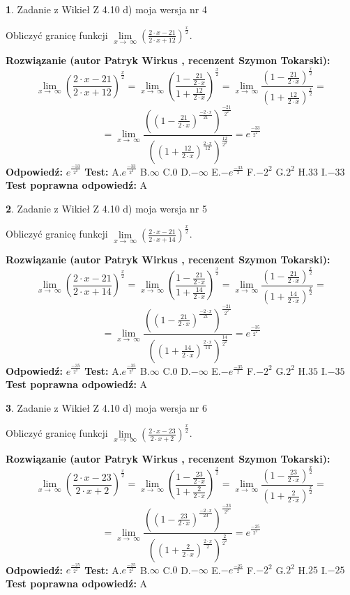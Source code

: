 \documentclass[12pt, a4paper]{article}
\theoremstyle{definition} %
\newtheorem{zad}{}
\newcommand{\zadStart}[1]{\begin{zad}#1\newline}
\newcommand{\zadStop}{\end{zad}}
\newcommand{\rozwStart}[2]{\noindent \textbf{Rozwiązanie (autor #1 , recenzent #2): }\newline}
\newcommand{\rozwStop}{\newline}
\newcommand{\odpStart}{\noindent \textbf{Odpowiedź:}\newline}
\newcommand{\odpStop}{\newline}
\newcommand{\testStart}{\noindent \textbf{Test:}\newline}
\newcommand{\testStop}{\newline}
\newcommand{\kluczStart}{\noindent \textbf{Test poprawna odpowiedź:}\newline}
\newcommand{\kluczStop}{\newline}
\begin{document}
\zadStart{Zadanie z Wikieł Z 4.10 d) moja wersja nr 4}


Obliczyć granicę funkcji  $\lim\limits_{x\to\ \infty}(\frac{2\cdot x-21}{2\cdot x+12})^{\frac{x}{2}}$.
\zadStop
\rozwStart{Patryk Wirkus}{Szymon Tokarski}
$$\lim\limits_{x\to\ \infty}(\frac{2\cdot x-21}{2\cdot x+12})^{\frac{x}{2}} = \lim\limits_{x\to\ \infty}(\frac{1-\frac{21}{2\cdot x}}{1+\frac{12}{2\cdot x}})^{\frac{x}{2}}=\lim\limits_{x\to\ \infty}\frac{(1-\frac{21}{2\cdot x})^{\frac{x}{2}}}{(1+\frac{12}{2\cdot x})^{\frac{x}{2}}}=$$
$$=\lim\limits_{x\to\ \infty}\frac{((1-\frac{21}{2\cdot x})^{\frac{-2\cdot x}{21}})^{\frac{-21}{2^{2}}}}{((1+\frac{12}{2\cdot x})^{\frac{2\cdot x}{12}})^{\frac{12}{2^{2}}}}=e^{\frac{-33}{2^{2}}}$$
\rozwStop
\odpStart
$e^{\frac{-33}{2^{2}}}$
\odpStop
\testStart
A.$e^{\frac{-33}{2^{2}}}$ B.$\infty$ C.$0$ D.$-\infty$ E.$-e^{\frac{-33}{2}}$
F.$-2^{2}$ G.$2^{2}$
H.$33$
I.$-33$
\testStop
\kluczStart
A
\kluczStop



\zadStart{Zadanie z Wikieł Z 4.10 d) moja wersja nr 5}


Obliczyć granicę funkcji  $\lim\limits_{x\to\ \infty}(\frac{2\cdot x-21}{2\cdot x+14})^{\frac{x}{2}}$.
\zadStop
\rozwStart{Patryk Wirkus}{Szymon Tokarski}
$$\lim\limits_{x\to\ \infty}(\frac{2\cdot x-21}{2\cdot x+14})^{\frac{x}{2}} = \lim\limits_{x\to\ \infty}(\frac{1-\frac{21}{2\cdot x}}{1+\frac{14}{2\cdot x}})^{\frac{x}{2}}=\lim\limits_{x\to\ \infty}\frac{(1-\frac{21}{2\cdot x})^{\frac{x}{2}}}{(1+\frac{14}{2\cdot x})^{\frac{x}{2}}}=$$
$$=\lim\limits_{x\to\ \infty}\frac{((1-\frac{21}{2\cdot x})^{\frac{-2\cdot x}{21}})^{\frac{-21}{2^{2}}}}{((1+\frac{14}{2\cdot x})^{\frac{2\cdot x}{14}})^{\frac{14}{2^{2}}}}=e^{\frac{-35}{2^{2}}}$$
\rozwStop
\odpStart
$e^{\frac{-35}{2^{2}}}$
\odpStop
\testStart
A.$e^{\frac{-35}{2^{2}}}$ B.$\infty$ C.$0$ D.$-\infty$ E.$-e^{\frac{-35}{2}}$
F.$-2^{2}$ G.$2^{2}$
H.$35$
I.$-35$
\testStop
\kluczStart
A
\kluczStop



\zadStart{Zadanie z Wikieł Z 4.10 d) moja wersja nr 6}


Obliczyć granicę funkcji  $\lim\limits_{x\to\ \infty}(\frac{2\cdot x-23}{2\cdot x+2})^{\frac{x}{2}}$.
\zadStop
\rozwStart{Patryk Wirkus}{Szymon Tokarski}
$$\lim\limits_{x\to\ \infty}(\frac{2\cdot x-23}{2\cdot x+2})^{\frac{x}{2}} = \lim\limits_{x\to\ \infty}(\frac{1-\frac{23}{2\cdot x}}{1+\frac{2}{2\cdot x}})^{\frac{x}{2}}=\lim\limits_{x\to\ \infty}\frac{(1-\frac{23}{2\cdot x})^{\frac{x}{2}}}{(1+\frac{2}{2\cdot x})^{\frac{x}{2}}}=$$
$$=\lim\limits_{x\to\ \infty}\frac{((1-\frac{23}{2\cdot x})^{\frac{-2\cdot x}{23}})^{\frac{-23}{2^{2}}}}{((1+\frac{2}{2\cdot x})^{\frac{2\cdot x}{2}})^{\frac{2}{2^{2}}}}=e^{\frac{-25}{2^{2}}}$$
\rozwStop
\odpStart
$e^{\frac{-25}{2^{2}}}$
\odpStop
\testStart
A.$e^{\frac{-25}{2^{2}}}$ B.$\infty$ C.$0$ D.$-\infty$ E.$-e^{\frac{-25}{2}}$
F.$-2^{2}$ G.$2^{2}$
H.$25$
I.$-25$
\testStop
\kluczStart
A
\kluczStop
\end{document}

